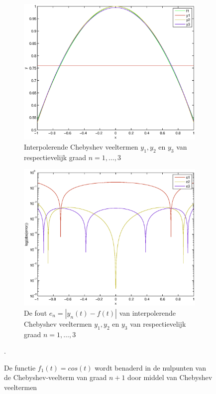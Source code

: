 \documentclass[a4paper]{article}
\begin{document}
\begin{figure}
    \centering
    \begin{subfigure}[t]{0.45\textwidth}
        \centering
        \includegraphics[width=\textwidth]{Jona/cheby_cos_interpolation.eps}
        \caption{Interpolerende Chebyshev veeltermen $y_{1},y_{2}$ en $y_{3}$ van respectievelijk graad $n=1,\dots,3$}
    \label{fig:cheb_cos_interpol}
    \end{subfigure}
    \begin{subfigure}[t]{0.45\textwidth}
        \centering
        \includegraphics[width=\textwidth]{Jona/cheby_cos_error.eps}
        \caption{De fout $e_{n} = |y_{n}(t)-f(t)|$ van interpolerende Chebyshev veeltermen $y_{1},y_{2}$ en $y_{3}$ van respectievelijk graad $n=1,\dots,3$}
        \label{fig:cheb_cos_error}
    \end{subfigure}
    \caption{De functie $f_{1}(t) = cos(t)$ wordt benaderd in de nulpunten van de Chebyshev-veelterm van graad $n+1$ door middel van Chebyshev veeltermen}\label{fig:cheb_cos}.
\end{figure}
\end{document}
